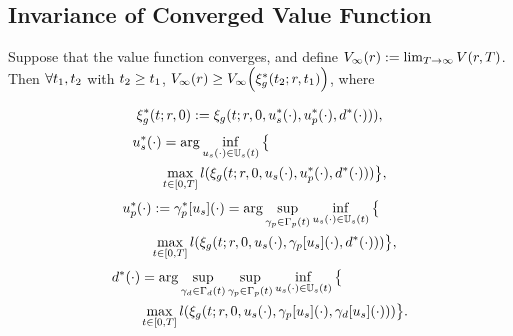 \subsection{Invariance of Converged Value Function}
 \begin{prop}
   \label{prop:main}
   Suppose that the value function converges, and define $V_\infty(r) := \lim_{T\rightarrow\infty}V(r, T)$. Then $\forall t_1, t_2$ with $t_2 \ge t_1$, $V_\infty(r) \ge V_\infty\Big(\xi_g^*(t_2; r, t_1)\Big)$, where

   \begin{equation}
   \begin{aligned}
   \xi_g^*(t; r, 0) := \xi_g(t; r, 0, u_s^*(\cdot), u_p^*(\cdot), d^*(\cdot))), \\
   \end{aligned}
   \end{equation}
   \begin{equation}
   \begin{aligned}
   &u_s^*(\cdot) = \arg \inf_{u_s(\cdot)\in\mathbb{U}_s(t)}\big\{\\
   & \qquad \max_{t \in [0, T]} l(\xi_g(t; r, 0, u_s(\cdot), u_p^*(\cdot), d^*(\cdot))) \big\},\\
    \end{aligned}
   \end{equation}
   \begin{equation}
   \begin{aligned}
   & u_p^*(\cdot) := \gamma_p^*[u_s](\cdot) = \arg \sup_{\gamma_{p} \in \Gamma_p(t)} \inf_{u_s(\cdot) \in \mathbb{U}_s(t)} \big\{ \\
   & \qquad \max_{t \in [0, T]} l(\xi_g(t; r, 0, u_s(\cdot), \gamma_p[u_s](\cdot), d^*(\cdot))) \big\}, \\
    \end{aligned}
   \end{equation}
   \begin{equation}
   \begin{aligned}
   & d^*(\cdot) = \arg \sup_{\gamma_{d} \in \Gamma_d(t)} \sup_{\gamma_{p} \in \Gamma_p(t)} \inf_{u_s(\cdot) \in \mathbb{U}_s(t)} \big\{\\
   & \qquad \max_{t \in [0, T]} l(\xi_g(t; r, 0, u_s(\cdot), \gamma_p[u_s](\cdot), \gamma_d[u_s](\cdot))) \big\}.
   \end{aligned}
   \end{equation}
 \end{prop}

